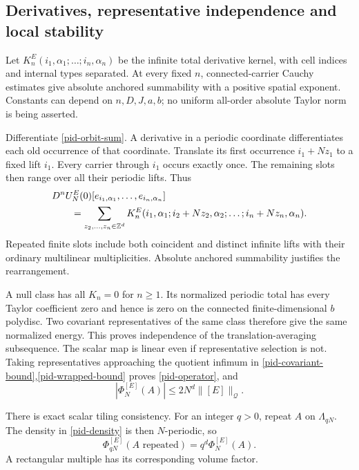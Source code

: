 \documentclass[11pt]{article}
\theoremstyle{remark}
\begin{document}
\subsection{Derivatives, representative independence and local stability}
\label{pid-kernel-section}

Let $K_n^E(i_1,\alpha_1;\ldots;i_n,\alpha_n)$ be the infinite
total derivative kernel, with cell indices and internal types
separated. At every fixed $n$, connected-carrier Cauchy estimates
give absolute anchored summability with a positive spatial
exponent. Constants can depend on $n,D,J,a,b$; no uniform
all-order absolute Taylor norm is being asserted.

Differentiate \eqref{pid-orbit-sum}. A derivative in a periodic
coordinate differentiates each old occurrence of that coordinate.
Translate its first occurrence $i_1+Nz_1$ to a fixed lift $i_1$.
Every carrier through $i_1$ occurs exactly once. The remaining
slots then range over all their periodic lifts. Thus
\begin{align}
 &D^nU_N^E(0)[e_{i_1,\alpha_1},\ldots,e_{i_n,\alpha_n}]
 \notag\\
 &\qquad=\sum_{z_2,\ldots,z_n\in\mathbb Z^d}
 K_n^E(i_1,\alpha_1;
       i_2+Nz_2,\alpha_2;\ldots;i_n+Nz_n,\alpha_n).
 \label{pid-kernel-periodization}
\end{align}
Repeated finite slots include both coincident and distinct
infinite lifts with their ordinary multilinear multiplicities.
Absolute anchored summability justifies the rearrangement.

A null class has all $K_n=0$ for $n\ge1$. Its normalized
periodic total has every Taylor coefficient zero and hence is
zero on the connected finite-dimensional $b$ polydisc. Two
covariant representatives of the same class therefore give the
same normalized energy. This proves independence of the
translation-averaging subsequence. The scalar map is linear
even if representative selection is not. Taking representatives
approaching the quotient infimum in
\eqref{pid-covariant-bound},\eqref{pid-wrapped-bound} proves
\eqref{pid-operator}, and
\begin{equation}
 |\Phi_N^{[E]}(A)|\le2N^d\|[E]\|_{\mathcal Q}.
 \label{pid-energy-bound}
\end{equation}

There is exact scalar tiling consistency. For an integer $q>0$,
repeat $A$ on $\Lambda_{qN}$. The density in
\eqref{pid-density} is then $N$-periodic, so
\begin{equation}
 \Phi_{qN}^{[E]}(A\text{ repeated})=q^d\Phi_N^{[E]}(A).
 \label{pid-tiling}
\end{equation}
A rectangular multiple has its corresponding volume factor.
\end{document}
